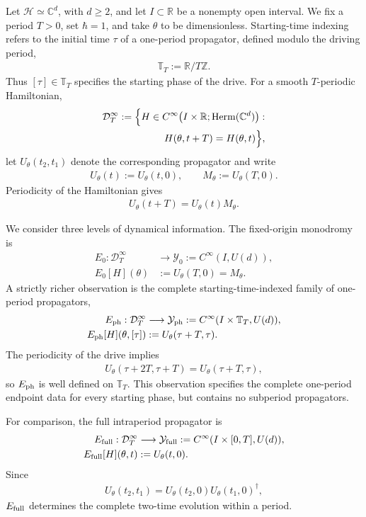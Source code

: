 \documentclass[twocolumn,prl,aps,floatfix]{revtex4-2}
\begin{document}
Let $\mathcal H\simeq\mathbb C^d$, with $d\ge2$, and let $I\subset\mathbb R$ be a nonempty open interval. We fix a period $T>0$, set $\hbar=1$, and take $\theta$ to be dimensionless. Starting-time indexing refers to the initial time $\tau$ of a one-period propagator, defined modulo the driving period,
\begin{align}
\mathbb T_T:=\mathbb R/T\mathbb Z .
\end{align}
Thus $[\tau]\in\mathbb T_T$ specifies the starting phase of the drive. For a smooth $T$-periodic Hamiltonian,
\begin{align}
\mathcal D_T^\infty
:=
\Bigl\{
H\in C^\infty
\bigl(I\times\mathbb R;\operatorname{Herm}(\mathbb C^d)\bigr):
\nonumber\\
H(\theta,t+T)=H(\theta,t)
\Bigr\},
\end{align}
let $U_\theta(t_2,t_1)$ denote the corresponding propagator and write
\begin{align}
U_\theta(t):=U_\theta(t,0),
\qquad
M_\theta:=U_\theta(T,0).
\end{align}
Periodicity of the Hamiltonian gives
\begin{align}
U_\theta(t+T)
=
U_\theta(t)M_\theta .
\label{eq:floquet_property}
\end{align}

We consider three levels of dynamical information. The fixed-origin monodromy is
\begin{align}
E_0:\mathcal D_T^\infty
&\longrightarrow
\mathcal Y_0:=C^\infty(I,U(d)),
\nonumber\\
E_0[H](\theta)
&:=U_\theta(T,0)=M_\theta .
\label{eq:E0}
\end{align}
A strictly richer observation is the complete starting-time-indexed family of one-period propagators,
\begin{align}
E_{\rm ph}:\mathcal D_T^\infty
&\longrightarrow
\mathcal Y_{\rm ph}
:=C^\infty(I\times\mathbb T_T,U(d)),
\nonumber\\
E_{\rm ph}[H](\theta,[\tau])
&:=U_\theta(\tau+T,\tau).
\label{eq:Eph}
\end{align}
The periodicity of the drive implies
\begin{align}
U_\theta(\tau+2T,\tau+T)
=
U_\theta(\tau+T,\tau),
\end{align}
so $E_{\rm ph}$ is well defined on $\mathbb T_T$. This observation specifies the complete one-period endpoint data for every starting phase, but contains no subperiod propagators.

For comparison, the full intraperiod propagator is
\begin{align}
E_{\rm full}:\mathcal D_T^\infty
&\longrightarrow
\mathcal Y_{\rm full}
:=C^\infty(I\times[0,T],U(d)),
\nonumber\\
E_{\rm full}[H](\theta,t)
&:=U_\theta(t,0).
\label{eq:Efull}
\end{align}
Since
\begin{align}
U_\theta(t_2,t_1)
=
U_\theta(t_2,0)
U_\theta(t_1,0)^\dagger ,
\end{align}
$E_{\rm full}$ determines the complete two-time evolution within a period.
\end{document}
